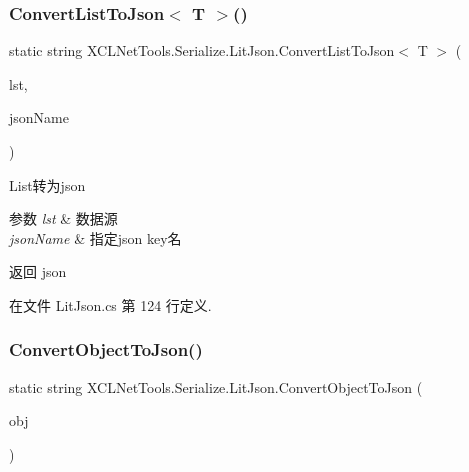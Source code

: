 \subsubsection{\texorpdfstring{Convert\+List\+To\+Json$<$ T $>$()}{ConvertListToJson< T >()}}
{\footnotesize\ttfamily static string X\+C\+L\+Net\+Tools.\+Serialize.\+Lit\+Json.\+Convert\+List\+To\+Json$<$ T $>$ (\begin{DoxyParamCaption}\item[{I\+List$<$ T $>$}]{lst,  }\item[{string}]{json\+Name }\end{DoxyParamCaption})\hspace{0.3cm}{\ttfamily [static]}}



List转为json 


\begin{DoxyParams}{参数}
{\em lst} & 数据源\\
\hline
{\em json\+Name} & 指定json key名\\
\hline
\end{DoxyParams}
\begin{DoxyReturn}{返回}
json
\end{DoxyReturn}


在文件 Lit\+Json.\+cs 第 124 行定义.

\mbox{\label{class_x_c_l_net_tools_1_1_serialize_1_1_lit_json_a81a2b398d509a227753a98e12a79674e}} 
\subsubsection{\texorpdfstring{Convert\+Object\+To\+Json()}{ConvertObjectToJson()}}
{\footnotesize\ttfamily static string X\+C\+L\+Net\+Tools.\+Serialize.\+Lit\+Json.\+Convert\+Object\+To\+Json (\begin{DoxyParamCaption}\item[{object}]{obj }\end{DoxyParamCaption})\hspace{0.3cm}{\ttfamily [static]}}



